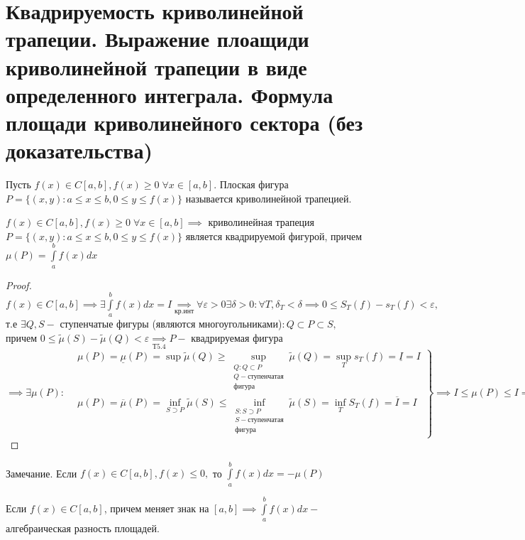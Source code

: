 \documentclass[../main.tex]{subfiles}
\begin{document}
\section{Квадрируемость криволинейной трапеции. Выражение плоащиди криволинейной трапеции в виде определенного интеграла. Формула площади криволинейного сектора (без доказательства)}
\begin{definition}
    Пусть $f(x) \in C[a,b], f(x)\geqslant 0 \;\forall x\in[a,b].$ Плоская фигура $P=\{(x,y): a\leqslant x\leqslant b , 0\leqslant y \leqslant f(x)\} $ называется криволинейной трапецией. 
\end{definition}
\begin{theorem}
    $f(x)\in C[a,b], f(x)\geqslant 0 \; \forall x\in[a,b]\implies$ криволинейная трапеция $P=\{(x,y): a\leqslant x\leqslant b, 0\leqslant y\leqslant f(x)\}$ является квадрируемой фигурой, причем $\mu(P)=\int\limits_{a   }^{b    } f(x)dx$
\end{theorem}
\begin{proof}
    $f(x)\in C[a,b] \implies \exists \int\limits_{a}^{b}f(x)dx = I\underset{\text{кр.инт}}{\implies} \forall \varepsilon>0 \exists \delta>0: \forall T, \delta_{T}<\delta\implies 0\leqslant S_{T}(f)-s_{T}(f)<\varepsilon,$ т.е $\exists Q,S - $ ступенчатые фигуры (являются многоугольниками)$: Q\subset P \subset S , $ причем $0\leqslant \tilde{\mu}(S )-\tilde{\mu}(Q)<\varepsilon \underset{\text{Т5.4}}{\implies} P-$ квадрируемая фигура $\implies \exists \mu(P): \left.\begin{aligned}&\mu(P)=\underline{\mu}(P)=\sup{\tilde{\mu}(Q)}\geqslant \underset{\substack{Q: Q\subset P \\ Q - \text{ступенчатая} \\ \text{фигура}}}{\sup}{\tilde{\mu}(Q)}=\underset{T}{\sup}{s_{T}(f)}=\underline{I}=I
    \\&\mu(P)=\overline{\mu}(P)=\underset{S \supset P}{\inf}{\tilde{\mu}(S)}\leqslant \underset{\substack{S: S\supset P \\ S - \text{ступенчатая} \\ \text{фигура}}}{\inf}{\tilde{\mu}(S)}=\underset{T}{\inf}{S_{T}(f)}=\overline{I}=I\end{aligned}\right\} \implies I\leqslant \mu(P)\leqslant I\implies \mu(P)=I$
\end{proof}
Замечание. Если $f(x)\in C[a,b], f(x)\leqslant 0,$ то $\int\limits_{a   }^{b    } f(x)dx=-\mu(P)$

Если $f(x)\in C[a,b]$, причем меняет знак на $[a,b]\implies \int\limits_{ a }^{b    } f(x)dx-$ алгебраическая разность площадей. 
\end{document}
